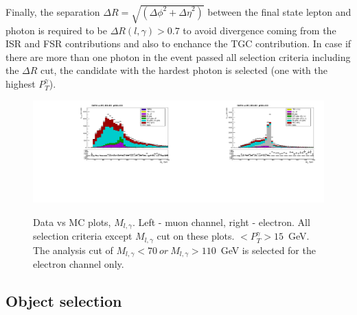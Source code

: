 Finally, the separation $\Delta R=\sqrt{({\Delta\phi}^2+{\Delta\eta}^2)}$ between the final state lepton and photon is required to be $\Delta R(l,\gamma)>0.7$ to avoid divergence coming from the ISR and FSR contributions and also to enchance the TGC contribution. In case if there are more than one photon in the event passed all selection criteria including the $\Delta R$ cut, the candidate with the hardest photon is selected (one with the highest $P_T^{\gamma}$). 

\begin{figure}[htb]
  \begin{center}
   \includegraphics[width=0.5\textwidth]{../figs/figs_v11/MUON_WGamma/PrepareYields/c_TotalDATAvsMC_EtaCommon__Mpholep1_pt15to500_.pdf}\includegraphics[width=0.5\textwidth]{../figs/figs_v11/ELECTRON_WGamma/PrepareYields/c_TotalDATAvsMC_EtaCommon__Mpholep1PRELIMINARY_FOR_E_TO_GAMMA_WITH_PSV_CUT_pt15to500_.pdf}
  \caption{Data vs MC plots, $M_{l,\gamma}$. Left - muon channel, right - electron. All selection criteria except $M_{l,\gamma}$ cut on these plots. $<P_T^{\gamma}>15$~GeV. The analysis cut of $M_{l,\gamma}<70~or~M_{l,\gamma}>110$~GeV is selected for the electron channel only.}
  \label{fig:DATAvsMC_Mpholep1}
  \end{center}
\end{figure}

\subsection{Object selection}
\label{sec:AN_ObjectSelection}

